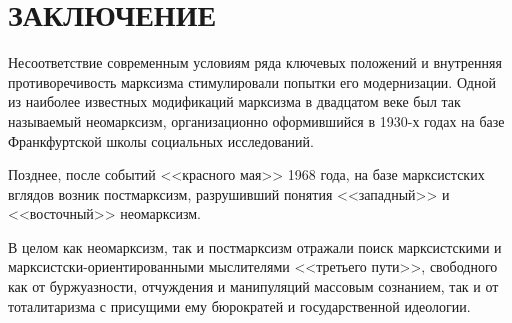 \section*{ЗАКЛЮЧЕНИЕ}

Несоответствие современным условиям ряда ключевых положений и внутренняя
противоречивость марксизма стимулировали попытки его модернизации.
Одной из наиболее известных модификаций марксизма в двадцатом веке был так называемый
неомарксизм, организационно оформившийся в 1930-х годах на базе Франкфуртской
школы социальных исследований.

Позднее, после событий <<красного мая>> 1968 года, на базе марксистских вглядов
возник постмарксизм, разрушивший понятия <<западный>> и <<восточный>> неомарксизм.

В целом как неомарксизм, так и постмарксизм отражали поиск марксистскими и
марксистски-ориентированными мыслителями <<третьего пути>>, свободного как от буржуазности,
отчуждения и манипуляций массовым сознанием, так и от тоталитаризма
с присущими ему бюрокра­тей и государственной идеологии.

\pagebreak
